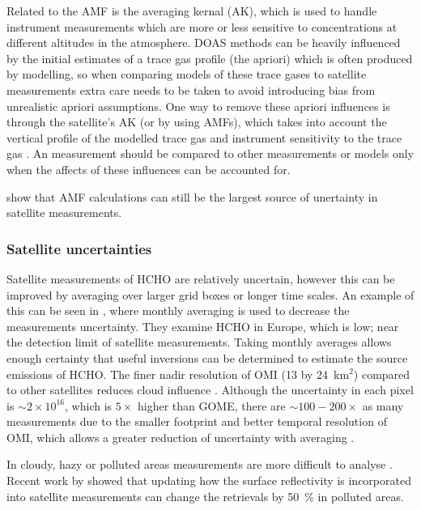       Related to the AMF is the averaging kernal (AK), which is used to handle instrument measurements which are more or less sensitive to concentrations at different altitudes in the atmosphere.
      DOAS methods can be heavily influenced by the initial estimates of a trace gas profile (the apriori) which is often produced by modelling, so when comparing models of these trace gases to satellite measurements extra care needs to be taken to avoid introducing bias from unrealistic apriori assumptions.
      One way to remove these apriori influences is through the satellite's AK (or by using AMFs), which takes into account the vertical profile of the modelled trace gas and instrument sensitivity to the trace gas \citep{Eskes2003, Palmer2001}.
      An measurement should be compared to other measurements or models only when the affects of these influences can be accounted for.
      
      
      \citet{Lorente2017} show that AMF calculations can still be the largest source of unertainty in satellite measurements.
    
    \subsubsection{Satellite uncertainties}
      Satellite measurements of HCHO are relatively uncertain, however this can be improved by averaging over larger grid boxes or longer time scales.
      An example of this can be seen in \citet{Dufour2009}, where monthly averaging is used to decrease the measurements uncertainty.
      They examine HCHO in Europe, which is low; near the detection limit of satellite measurements.
      Taking monthly averages allows enough certainty that useful inversions can be determined to estimate the source emissions of HCHO.
      The finer nadir resolution of OMI (13 by 24~km${^2}$) compared to other satellites reduces cloud influence \citep{Millet2006, Millet2008}. 
      Although the uncertainty in each pixel is $\sim 2 \times 10^{16}$, which is $5 \times$ higher than GOME, there are $\sim 100-200 \times $ as many measurements due to the smaller footprint and better temporal resolution of OMI, which allows a greater reduction of uncertainty with averaging \citep{Chance2002,Millet2008}.
      
      In cloudy, hazy or polluted areas measurements are more difficult to analyse \citep[e.g.][]{Palmer2003,Marais2014}.
      Recent work by \cite{Vasilkov2017} showed that updating how the surface reflectivity is incorporated into satellite measurements can change the retrievals by 50~\% in polluted areas.
      
